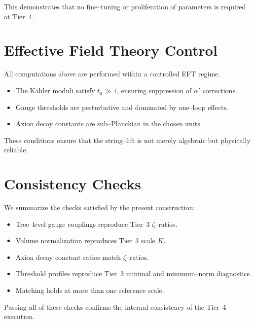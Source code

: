 \documentclass[11pt]{article}
\begin{document}
\begin{remark}
This demonstrates that no fine--tuning or proliferation of parameters is
required at Tier~4.
\end{remark}

\section{Effective Field Theory Control}

All computations above are performed within a controlled EFT regime.

\begin{itemize}
  \item The K\"ahler moduli satisfy $t_a \gg 1$, ensuring suppression of
        $\alpha'$ corrections.
  \item Gauge thresholds are perturbative and dominated by one--loop
        effects.
  \item Axion decay constants are sub--Planckian in the chosen units.
\end{itemize}

\begin{remark}
These conditions ensure that the string--lift is not merely algebraic
but physically reliable.
\end{remark}

\section{Consistency Checks}

We summarize the checks satisfied by the present construction:
\begin{itemize}
  \item Tree--level gauge couplings reproduce Tier~3 $\zeta$--ratios.
  \item Volume normalization reproduces Tier~3 scale $K$.
  \item Axion decay constant ratios match $\zeta$--ratios.
  \item Threshold profiles reproduce Tier~3 minimal and minimum--norm
        diagnostics.
  \item Matching holds at more than one reference scale.
\end{itemize}

Passing all of these checks confirms the internal consistency of the
Tier~4 execution.
\end{document}
